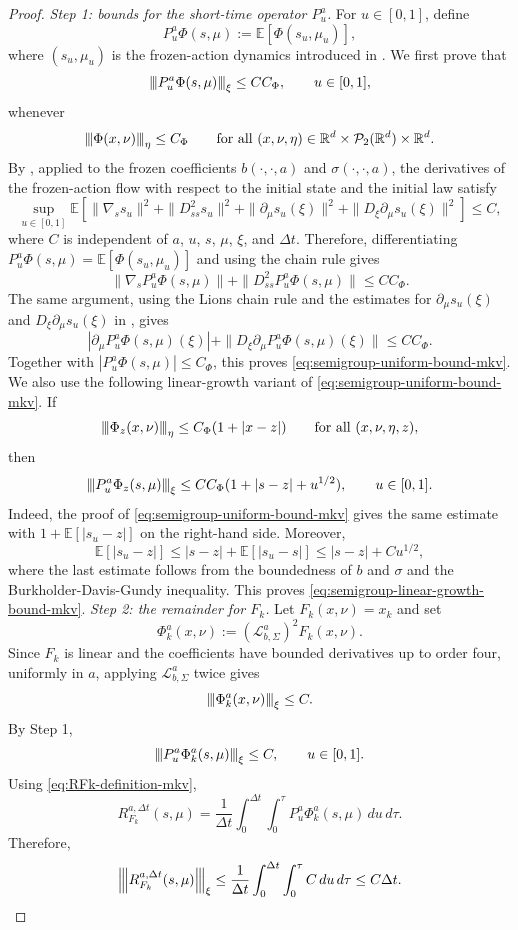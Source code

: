 \documentclass[a4paper, 10pt, english, reqno]{amsart}
\def\R{\mathbb R}
\newcommand{\tnorm}[1]{\left\vert\kern-0.25ex\left\vert\kern-0.25ex\left\vert #1
\right\vert\kern-0.25ex\right\vert\kern-0.25ex\right\vert}
\begin{document}
\begin{proof}
\emph{Step 1: bounds for the short-time operator $P_u^a$.}
For $u\in[0,1]$, define
\[
P_u^a\Phi(s,\mu):=\mathbb E[\Phi(s_u,\mu_u)],
\]
where $(s_u,\mu_u)$ is the frozen-action dynamics introduced in . We first prove that
\begin{equation}
\label{eq:semigroup-uniform-bound-mkv}
\tnorm{P_u^a\Phi(s,\mu)}_{\xi}\le C C_\Phi,
\qquad u\in[0,1],
\end{equation}
whenever
\[
\tnorm{\Phi(x,\nu)}_{\eta}\le C_\Phi
\qquad
\text{for all }(x,\nu,\eta)\in\R^d\times\mathcal P_2(\R^d)\times\R^d.
\]
By \cite[Lemma A.4, estimate (52)]{firstpaper}, applied to the frozen coefficients $b(\cdot,\cdot,a)$ and $\sigma(\cdot,\cdot,a)$, the derivatives of the frozen-action flow with respect to the initial state and the initial law satisfy
\[
\sup_{u\in[0,1]}\mathbb E\!\left[
\|\nabla_s s_u\|^2+\|D_{ss}^2s_u\|^2+\|\partial_\mu s_u(\xi)\|^2+\|D_\xi\partial_\mu s_u(\xi)\|^2
\right]\le C,
\]
where $C$ is independent of $a$, $u$, $s$, $\mu$, $\xi$, and $\Delta t$. Therefore, differentiating $P_u^a\Phi(s,\mu)=\mathbb E[\Phi(s_u,\mu_u)]$ and using the chain rule gives
\[
\|\nabla_s P_u^a\Phi(s,\mu)\|+\|D_{ss}^2P_u^a\Phi(s,\mu)\|\le C C_\Phi.
\]
The same argument, using the Lions chain rule and the estimates for $\partial_\mu s_u(\xi)$ and $D_\xi\partial_\mu s_u(\xi)$ in \cite[Lemma A.4, estimate (52)]{firstpaper}, gives
\[
|\partial_\mu P_u^a\Phi(s,\mu)(\xi)|+\|D_\xi\partial_\mu P_u^a\Phi(s,\mu)(\xi)\|\le C C_\Phi.
\]
Together with $|P_u^a\Phi(s,\mu)|\le C_\Phi$, this proves \eqref{eq:semigroup-uniform-bound-mkv}.
We also use the following linear-growth variant of \eqref{eq:semigroup-uniform-bound-mkv}. If
\[
\tnorm{\Phi_z(x,\nu)}_{\eta}\le C_\Phi(1+|x-z|)
\qquad
\text{for all }(x,\nu,\eta,z),
\]
then
\begin{equation}
\label{eq:semigroup-linear-growth-bound-mkv}
\tnorm{P_u^a\Phi_z(s,\mu)}_{\xi}
\le
C C_\Phi(1+|s-z|+u^{1/2}),
\qquad u\in[0,1].
\end{equation}
Indeed, the proof of \eqref{eq:semigroup-uniform-bound-mkv} gives the same estimate with $1+\mathbb E[|s_u-z|]$ on the right-hand side. Moreover,
\[
\mathbb E[|s_u-z|]\le |s-z|+\mathbb E[|s_u-s|]\le |s-z|+Cu^{1/2},
\]
where the last estimate follows from the boundedness of $b$ and $\sigma$ and the Burkholder-Davis-Gundy inequality. This proves \eqref{eq:semigroup-linear-growth-bound-mkv}.
\emph{Step 2: the remainder for $F_k$.}
Let $F_k(x,\nu)=x_k$ and set
\[
  \Phi_k^a(x,\nu):=(\mathscr L_{b,\Sigma}^a)^2F_k(x,\nu).
\]
Since $F_k$ is linear and the coefficients have bounded derivatives up
to order four, uniformly in $a$, applying $\mathscr L_{b,\Sigma}^a$
twice gives
\[
  \tnorm{\Phi_k^a(x,\nu)}_{\xi}\le C.
\]
By Step 1,
\[
  \tnorm{P_u^a\Phi_k^a(s,\mu)}_{\xi}\le C,
  \qquad u\in[0,1].
\]
Using \eqref{eq:RFk-definition-mkv},
\[
R_{F_k}^{a,\Delta t}(s,\mu)
=
\frac1{\Delta t}
\int_0^{\Delta t}\int_0^\tau
P_u^a\Phi_k^a(s,\mu)\,du\,d\tau .
\]
Therefore,
\[
\tnorm{R_{F_k}^{a,\Delta t}(s,\mu)}_{\xi}
\le
\frac1{\Delta t}
\int_0^{\Delta t}\int_0^\tau C\,du\,d\tau
\le
C\Delta t .
\]


\end{proof}
\end{document}
